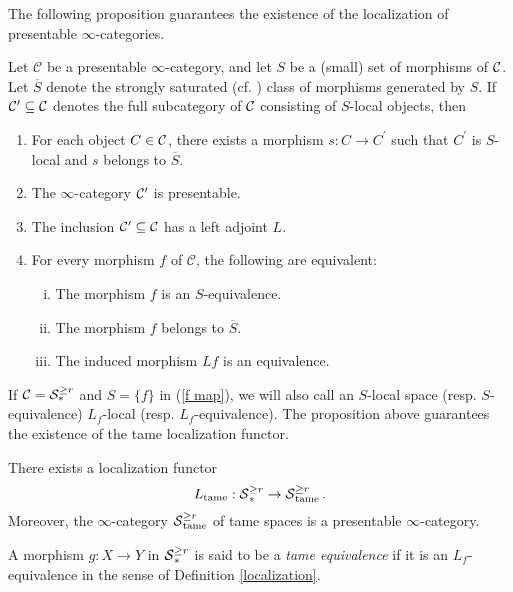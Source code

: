 The following proposition guarantees the existence of the localization of presentable $\infty$-categories.
\begin{proposition}
    \cite[Proposition 5.5.4.15.]{HTT}
    \label{Prop 5.5.4.15. HTT}
    Let $\mathcal{C}$ be a presentable $\infty$-category, and let $S$ be a (small) set of morphisms of ${\mathcal{C}}$. Let $\overline{S}$ denote the strongly saturated (cf. \cite[Definition 5.5.4.5.]{HTT}) class of morphisms generated by $S$. If $\mathcal{C}^{\prime} \subseteq {\mathcal{C}}$ denotes the full subcategory of ${\mathcal{C}}$ consisting of $S$-local objects, then
    \begin{enumerate}
        \item For each object $C \in {\mathcal{C}}$, there exists a morphism $s: C \rightarrow C^{\prime}$ such that $C^{\prime}$ is $S$-local and $s$ belongs to $\overline{S}$.
        \item The $\infty$-category ${\mathcal{C}}'$ is presentable.
        \item The inclusion ${\mathcal{C}}' \subseteq \mathcal{C}$ has a left adjoint $L$.
        \item For every morphism $f$ of $\mathcal{C}$, the following are equivalent:
        \begin{enumerate}[(i)]
            \item  The morphism $f$ is an $S$-equivalence.
            \item The morphism $f$ belongs to $\overline{S}$.
            \item The induced morphism $L f$ is an equivalence.
        \end{enumerate}
    \end{enumerate}
\end{proposition}
If ${\mathcal{C}} = {\mathcal{S}}^{\geq r}_{*}$ and $S= \{f\}$ in (\ref{f map}), we will also call an $S$-local space (resp. $S$-equivalence) $L_f$-local (resp. $L_f$-equivalence).
The proposition above guarantees the existence of the tame localization functor. 
\begin{corollary}
\label{existence of tame localization}
There exists a localization functor
$$
L_{\operatorname{\operatorname{tame}}}: \operatorname{\mathcal{S}}^{\geq r}_* \to \operatorname{\mathcal{S}}^{\geq r}_{\operatorname{\operatorname{tame}}}.
$$
Moreover, the $\infty$-category $\operatorname{\mathcal{S}}^{\geq r}_{\operatorname{\operatorname{tame}}}$ of tame spaces is a presentable $\infty$-category.
\end{corollary}
\begin{definition}
    A morphism $g:X \to Y$ in $\operatorname{\mathcal{S}}^{\geq r}_*$ is said to be a \emph{tame equivalence} if it is an $L_f$-equivalence in the sense of Definition \ref{localization}.
\end{definition}

